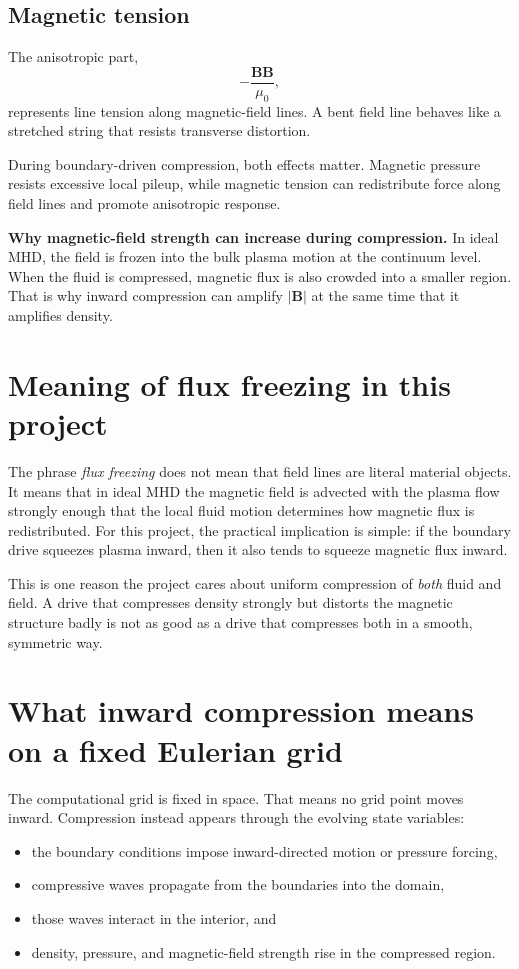 \documentclass[11pt]{article}
\begin{document}
\subsection{Magnetic tension}
The anisotropic part,
\[
-\frac{\mathbf{B}\mathbf{B}}{\mu_0},
\]
represents line tension along magnetic-field lines. A bent field line behaves like a stretched string that resists transverse distortion.

During boundary-driven compression, both effects matter. Magnetic pressure resists excessive local pileup, while magnetic tension can redistribute force along field lines and promote anisotropic response.

\begin{keybox}
\textbf{Why magnetic-field strength can increase during compression.} In ideal MHD, the field is frozen into the bulk plasma motion at the continuum level. When the fluid is compressed, magnetic flux is also crowded into a smaller region. That is why inward compression can amplify $|\mathbf{B}|$ at the same time that it amplifies density.
\end{keybox}

\section{Meaning of flux freezing in this project}
The phrase \emph{flux freezing} does not mean that field lines are literal material objects. It means that in ideal MHD the magnetic field is advected with the plasma flow strongly enough that the local fluid motion determines how magnetic flux is redistributed. For this project, the practical implication is simple: if the boundary drive squeezes plasma inward, then it also tends to squeeze magnetic flux inward.

This is one reason the project cares about uniform compression of \emph{both} fluid and field. A drive that compresses density strongly but distorts the magnetic structure badly is not as good as a drive that compresses both in a smooth, symmetric way.

\section{What inward compression means on a fixed Eulerian grid}
The computational grid is fixed in space. That means no grid point moves inward. Compression instead appears through the evolving state variables:
\begin{itemize}
    \item the boundary conditions impose inward-directed motion or pressure forcing,
    \item compressive waves propagate from the boundaries into the domain,
    \item those waves interact in the interior, and
    \item density, pressure, and magnetic-field strength rise in the compressed region.
\end{itemize}
\end{document}
